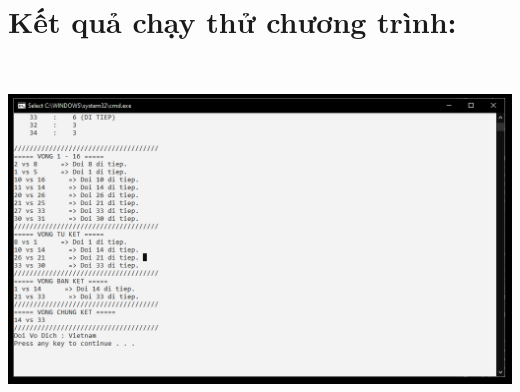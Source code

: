 \documentclass[a4paper]{article}
\begin{document}
\section{Kết quả chạy thử chương trình:}\\
\begin{center}
\includegraphics[scale=0.45]{ketqua.png}
\end{center}
\end{document}
